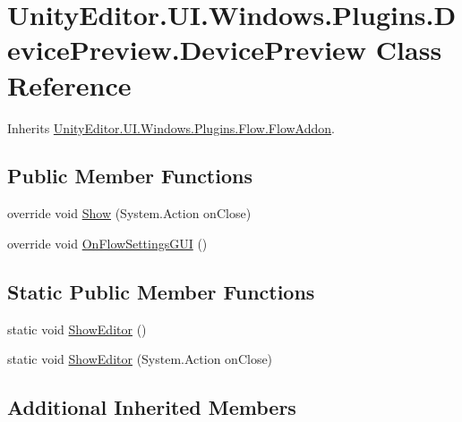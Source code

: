 \hypertarget{class_unity_editor_1_1_u_i_1_1_windows_1_1_plugins_1_1_device_preview_1_1_device_preview}{}\section{Unity\+Editor.\+U\+I.\+Windows.\+Plugins.\+Device\+Preview.\+Device\+Preview Class Reference}
\label{class_unity_editor_1_1_u_i_1_1_windows_1_1_plugins_1_1_device_preview_1_1_device_preview}


Inherits \hyperlink{class_unity_editor_1_1_u_i_1_1_windows_1_1_plugins_1_1_flow_1_1_flow_addon}{Unity\+Editor.\+U\+I.\+Windows.\+Plugins.\+Flow.\+Flow\+Addon}.

\subsection*{Public Member Functions}
\begin{DoxyCompactItemize}
\item 
override void \hyperlink{class_unity_editor_1_1_u_i_1_1_windows_1_1_plugins_1_1_device_preview_1_1_device_preview_a9277594a2cc92fc67cab8cd690affa62}{Show} (System.\+Action on\+Close)
\item 
override void \hyperlink{class_unity_editor_1_1_u_i_1_1_windows_1_1_plugins_1_1_device_preview_1_1_device_preview_a9b3855918ba70ce1e73e47d984b282d2}{On\+Flow\+Settings\+G\+U\+I} ()
\end{DoxyCompactItemize}
\subsection*{Static Public Member Functions}
\begin{DoxyCompactItemize}
\item 
static void \hyperlink{class_unity_editor_1_1_u_i_1_1_windows_1_1_plugins_1_1_device_preview_1_1_device_preview_afdac6fef3b931c0899eb957c1a39358e}{Show\+Editor} ()
\item 
static void \hyperlink{class_unity_editor_1_1_u_i_1_1_windows_1_1_plugins_1_1_device_preview_1_1_device_preview_a19a26dd6154f13ab154ae631002d8976}{Show\+Editor} (System.\+Action on\+Close)
\end{DoxyCompactItemize}
\subsection*{Additional Inherited Members}


